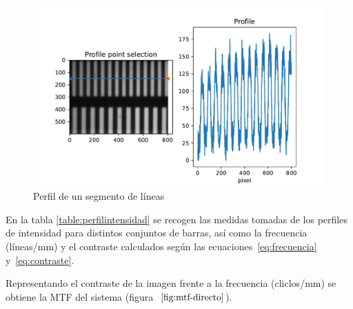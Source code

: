\documentclass{./packages/optica-article}
\begin{document}
\begin{figure}
	\includegraphics[width=\textwidth]{profile-lines.pdf}
	\caption{Perfil de un segmento de líneas}\label{fig:perfil:example}
\end{figure}

En la tabla \ref{table:perfilintensidad} se recogen las medidas tomadas de los perfiles de intensidad para distintos conjuntos de barras, así como la frecuencia (líneas/mm) y el contraste calculados según las ecuaciones~\ref{eq:frecuencia} y~\ref{eq:contraste}.

\begin{table}[hbp]
	\centering
	\caption{Datos de los perfiles de intensidad. $y$: intensidad. $x$. El contraste se ha obtenido a partir de la ecuación~\ref{eq:contraste}. La frecuencia se ha obtenido a través de la ecuación~\ref{eq:frecuencia}. Como se obtienen los periodos se explica visualmente en la Fig.~\ref{fig:perfil:example}}%
	\label{table:perfilintensidad}
\end{table}

Representando el contraste de la imagen frente a la frecuencia (cliclos/mm) se obtiene la MTF del sistema (figura $~\ref{fig:mtf-directo}$).
\end{document}
